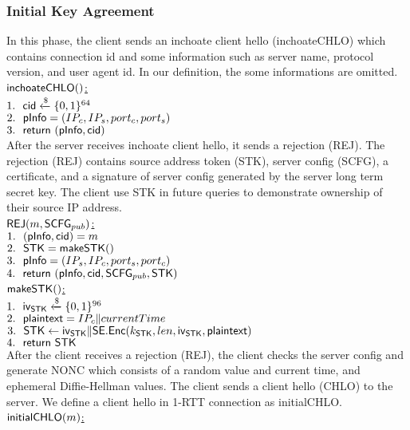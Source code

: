 \subsubsection{Initial Key Agreement}
In this phase, the client sends an inchoate client
hello (inchoateCHLO) which contains connection id
and some information such as server name, protocol
version, and user agent id. In our definition,
the some informations are omitted.
\\
\noindent
\underline{$\mathsf{inchoateCHLO}()$:} \\
 $1.\ \ \mathsf{cid} \xleftarrow{\$} \{0,1\}^{64} $ \\
 $2.\ \ \mathsf{pInfo} = (IP_c, IP_s, port_c, port_s)$ \\
 $3.\ \ \mathsf{return}\ (\mathsf{pInfo}, \mathsf{cid})$ \\
%
After the server receives inchoate client hello, it
sends a rejection (REJ). The rejection (REJ) contains
source address token (STK), server config (SCFG),
a certificate, and a signature of server config generated
by the server long term secret key. The client use
STK in future queries to demonstrate ownership of their
source IP address.
\\
\noindent
\underline{$\mathsf{REJ}(m, \mathsf{SCFG}_{pub})$:} \\
 $1.\ \ (\mathsf{pInfo}, \mathsf{cid}) = m$ \\
 $2.\ \ \mathsf{STK} = \mathsf{makeSTK}()$ \\
 $3.\ \ \mathsf{pInfo} = (IP_s, IP_c, port_s, port_c)$ \\
 $4.\ \ \mathsf{return}\ (\mathsf{pInfo}, \mathsf{cid}, \mathsf{SCFG}_{pub}, \mathsf{STK})$ \\
\underline{$\mathsf{makeSTK}()$:} \\
 $1.\ \ \mathsf{iv}_{\mathsf{STK}} \xleftarrow{\$} \{0,1\}^{96}$ \\
 $2.\ \ \mathsf{plaintext} = IP_c \| currentTime$ \\
 $3.\ \ \mathsf{STK} \leftarrow \mathsf{iv}_{\mathsf{STK}} \|
        \mathsf{SE}.\mathsf{Enc}(k_{\mathsf{STK}}, len,\mathsf{iv}_{\mathsf{STK}},
        \mathsf{plaintext})$ \\
 $4.\ \ \mathsf{return}\ \mathsf{STK}$ \\
%
After the client receives a rejection (REJ), the client
checks the server config and generate NONC which consists
of a random value and current time, and ephemeral
Diffie-Hellman values.
The client sends a client hello (CHLO) to the server.
We define a client hello in 1-RTT connection as initialCHLO.
\\
\noindent
\underline{$\mathsf{initialCHLO}(m)$:} \\
